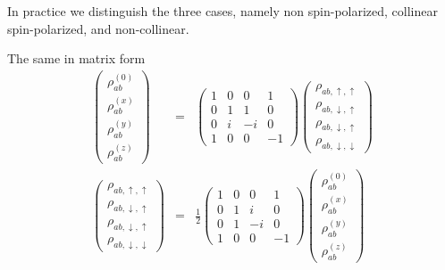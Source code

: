 \documentclass[11pt,a4paper]{report}
\begin{document}
In practice we distinguish the three cases, namely non spin-polarized,
collinear spin-polarized, and non-collinear.


The same in matrix form 
\begin{eqnarray}
\left(\begin{array}{c}
\rho_{ab}^{(0)}\\\rho_{ab}^{(x)}\\\rho_{ab}^{(y)}\\\rho_{ab}^{(z)}
\end{array}\right)
&=&
\left(\begin{array}{cccc}
1&0&0&1\\0&1&1&0\\0&i&-i&0\\1&0&0&-1
\end{array}\right)
\left(\begin{array}{c}
\rho_{ab,\uparrow,\uparrow}\\\rho_{ab,\downarrow,\uparrow}\\\rho_{ab,\downarrow,\uparrow}\\\rho_{ab,\downarrow,\downarrow}\end{array}\right)
\nonumber\\
\left(\begin{array}{c}
\rho_{ab,\uparrow,\uparrow}\\\rho_{ab,\downarrow,\uparrow}\\\rho_{ab,\downarrow,\uparrow}\\\rho_{ab,\downarrow,\downarrow}\end{array}\right)
&=&
\frac{1}{2}\left(\begin{array}{cccc}
1&0&0&1\\0&1&i&0\\0&1&-i&0\\1&0&0&-1
\end{array}\right)
\left(\begin{array}{c}
\rho_{ab}^{(0)}\\\rho_{ab}^{(x)}\\\rho_{ab}^{(y)}\\\rho_{ab}^{(z)}
\end{array}\right)
\end{eqnarray}



\end{document}
